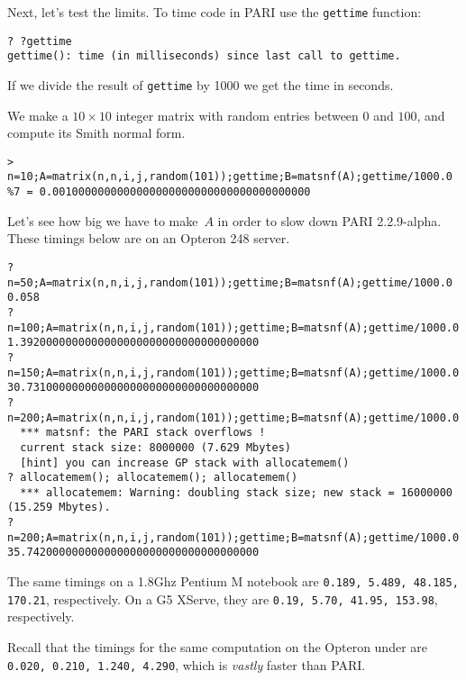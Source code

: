 Next, let's test the limits.  
To time code in PARI use the {\tt gettime} function:
\begin{verbatim}
? ?gettime
gettime(): time (in milliseconds) since last call to gettime.
\end{verbatim}
If we divide the result of {\tt gettime} by 1000 we get the time in seconds.

We make a $10\times 10$ 
integer matrix with random entries between $0$ and $100$,
and compute its Smith normal form.
\begin{verbatim}
> n=10;A=matrix(n,n,i,j,random(101));gettime;B=matsnf(A);gettime/1000.0
%7 = 0.0010000000000000000000000000000000000000
\end{verbatim}
Let's see how big we have to make~$A$ in order
to slow down PARI 2.2.9-alpha.
These timings below are on an Opteron 248 server. 
\begin{verbatim}
? n=50;A=matrix(n,n,i,j,random(101));gettime;B=matsnf(A);gettime/1000.0
0.058
? n=100;A=matrix(n,n,i,j,random(101));gettime;B=matsnf(A);gettime/1000.0
1.3920000000000000000000000000000000000
? n=150;A=matrix(n,n,i,j,random(101));gettime;B=matsnf(A);gettime/1000.0
30.731000000000000000000000000000000000
? n=200;A=matrix(n,n,i,j,random(101));gettime;B=matsnf(A);gettime/1000.0
  *** matsnf: the PARI stack overflows !
  current stack size: 8000000 (7.629 Mbytes)
  [hint] you can increase GP stack with allocatemem()
? allocatemem(); allocatemem(); allocatemem()
  *** allocatemem: Warning: doubling stack size; new stack = 16000000 (15.259 Mbytes).
? n=200;A=matrix(n,n,i,j,random(101));gettime;B=matsnf(A);gettime/1000.0
35.742000000000000000000000000000000000
\end{verbatim}
\begin{remark}
The same timings on a 1.8Ghz Pentium M notebook are 
{\tt 0.189, 5.489, 48.185, 170.21}, respectively.
On a G5 XServe, they are 
{\tt 0.19, 5.70, 41.95, 153.98}, respectively.

Recall that the timings for the same computation on the Opteron under \magma{}
are {\tt 0.020, 0.210, 1.240, 4.290}, which is {\em vastly} faster than PARI.
\end{remark}


